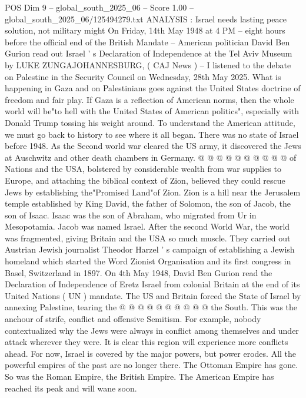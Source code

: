 \begin{textsample}{POS Dim 9 – global\_south\_2025\_06 – Score 1.00 – global\_south\_2025\_06/125494279.txt}  \label{ex:f9_pos_194}
ANALYSIS : Israel needs lasting peace solution, not military might On Friday, 14th May 1948 at 4 PM -- eight hours before the official end of the British Mandate -- American politician David Ben Gurion read out Israel ' s Declaration of Independence at the Tel Aviv Museum by LUKE ZUNGAJOHANNESBURG, ( CAJ News ) -- I listened to the debate on Palestine in the Security Council on Wednesday, 28th May 2025.
What is happening in Gaza and on Palestinians goes against the United States doctrine of freedom and fair play.
If Gaza is a reflection of American norms, then the whole world will be"to hell with the United States of American politics", especially with Donald Trump tossing his weight around.
To understand the American attitude, we must go back to history to see where it all began.
There was no state of Israel before 1948.
As the Second world war cleared the US army, it discovered the Jews at Auschwitz and other death chambers in Germany. @ @ @ @ @ @ @ @ @ @ of Nations and the USA, bolstered by considerable wealth from war supplies to Europe, and attaching the biblical context of Zion, believed they could rescue Jews by establishing the"Promised Land"of Zion.
Zion is a hill near the Jerusalem temple established by King David, the father of Solomon, the son of Jacob, the son of Isaac.
Isaac was the son of Abraham, who migrated from Ur in Mesopotamia.
Jacob was named Israel.
After the second World War, the world was fragmented, giving Britain and the USA so much muscle.
They carried out Austrian Jewish journalist Theodor Harzel ' s campaign of establishing a Jewish homeland which started the Word Zionist Organisation and its first congress in Basel, Switzerland in 1897.
On 4th May 1948, David Ben Gurion read the Declaration of Independence of Eretz Israel from colonial Britain at the end of its United Nations ( UN ) mandate.
The US and Britain forced the State of Israel by annexing Palestine, tearing the @ @ @ @ @ @ @ @ @ @ the South.
This was the anchour of strife, conflict and offensive Semitism.
For example, nobody contextualized why the Jews were always in conflict among themselves and under attack wherever they were.
It is clear this region will experience more conflicts ahead.
For now, Israel is covered by the major powers, but power erodes.
All the powerful empires of the past are no longer there.
The Ottoman Empire has gone.
So was the Roman Empire, the British Empire.
The American Empire has reached its peak and will wane soon.

\end{textsample}
